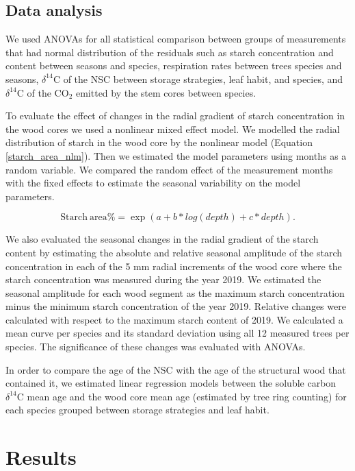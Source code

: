 \documentclass{article}
\begin{document}
 \subsection{Data analysis}
 
We used ANOVAs for all statistical comparison between groups of measurements that had normal distribution of the residuals such as starch concentration and content between seasons and species, respiration rates between trees species and seasons, $\delta^{14}$C of the NSC between storage strategies, leaf habit, and species, and $\delta^{14}$C of the CO$_{2}$ emitted by the stem cores between species.

To evaluate the effect of changes in the radial gradient of starch concentration in the wood cores we used a nonlinear mixed effect model. We modelled the radial distribution of starch in the wood core by the nonlinear model (Equation \ref{starch_area_nlm}). Then we estimated the model parameters using months as a random variable. We compared the random effect of the measurement months with the fixed effects to estimate the seasonal variability on the model parameters. 
 

\begin{equation}
\mathrm{Starch \ area} \%= \exp(a+b*log(depth)+c*depth).
\label{starch_area_nlm}
\end{equation}

We also evaluated the seasonal changes in the radial gradient of the starch content by estimating the absolute and relative seasonal amplitude of the starch concentration in each of the 5 mm radial increments of the wood core where the starch concentration was measured during the year 2019. We estimated the seasonal amplitude for each wood segment as the maximum starch concentration minus the minimum starch concentration of the year 2019. Relative changes were calculated with respect to the maximum starch content of 2019. We calculated a mean curve per species and its standard deviation using all 12 measured trees per species. The significance of these changes was evaluated with ANOVAs.

In order to compare the age of the NSC with the age of the structural wood that contained it, we estimated linear regression models between the soluble carbon $\delta^{14}$C mean age and the wood core mean age (estimated by tree ring counting) for each species grouped between storage strategies and leaf habit. 



\section{Results}
\end{document}
